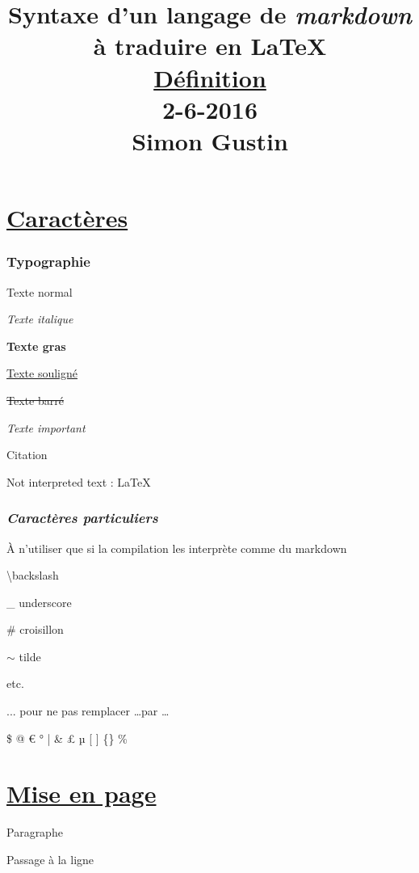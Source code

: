 \documentclass{article}
\title{Syntaxe d'un langage de \textit{markdown} à traduire en \textbf{LaTeX}\\\underline{Définition}\\2-6-2016\\Simon Gustin}
\author{}
\date{}
\begin{document}
\maketitle

	

	\part{\underline{Caractères}}

		\section{\textbf{Typographie}}

			Texte normal

			\textit{Texte italique}

			\textbf{Texte gras}

			\underline{Texte souligné}

			\sout{Texte barré}

			\emph{Texte important}

			\textrm{Citation }

			Not interpreted text : \LaTeX{}

			

		\section{\textit{Caractères particuliers}}%

			À n'utiliser que si la compilation les interprète comme du markdown

			\textbackslash  backslash

			\_ underscore

			\# croisillon

			$\sim$ tilde

			etc.

			

			... pour ne pas remplacer \dots  par …

			

			\$ @ € ° | \& £ µ [ ] \{\} \%%

			

	\part{\underline{Mise en page}}

		Paragraphe

		Passage à la ligne

		
\end{document}
